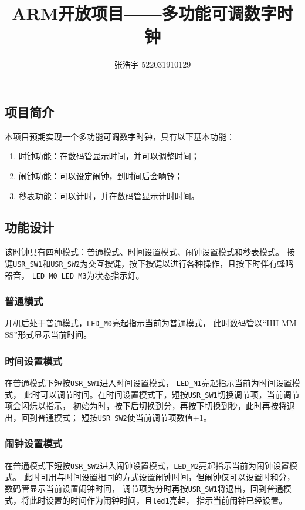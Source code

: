 \documentclass[12pt, a4paper, oneside]{ctexart}
\title{\textbf{ARM开放项目——多功能可调数字时钟}}
\author{张浩宇 522031910129}
\date{}
\begin{document}
    \maketitle
    \subsection{项目简介}
    本项目预期实现一个多功能可调数字时钟，具有以下基本功能：
    \begin{enumerate}
        \item 时钟功能：在数码管显示时间，并可以调整时间；
        \item 闹钟功能：可以设定闹钟，到时间后会响铃；
        \item 秒表功能：可以计时，并在数码管显示计时时间。
    \end{enumerate}
    \subsection{功能设计}
    该时钟具有四种模式：普通模式、时间设置模式、闹钟设置模式和秒表模式。
    按键\verb|USR_SW1|和\verb|USR_SW2|为交互按键，按下按键以进行各种操作，且按下时伴有蜂鸣器音，
    \verb|LED_M0|~\verb|LED_M3|为状态指示灯。
    \subsubsection{普通模式}
    开机后处于普通模式，\verb|LED_M0|亮起指示当前为普通模式，
    此时数码管以“HH-MM-SS”形式显示当前时间。
    \subsubsection{时间设置模式}
    在普通模式下短按\verb|USR_SW1|进入时间设置模式，
    \verb|LED_M1|亮起指示当前为时间设置模式，
    此时可以调节时间。在时间设置模式下，短按\verb|USR_SW1|切换调节项，当前调节项会闪烁以指示，
    初始为时，按下后切换到分，再按下切换到秒，此时再按将退出，回到普通模式；
    短按\verb|USR_SW2|使当前调节项数值+1。
    \subsubsection{闹钟设置模式}
    在普通模式下短按\verb|USR_SW2|进入闹钟设置模式，\verb|LED_M2|亮起指示当前为闹钟设置模式。
    此时可用与时间设置相同的方式设置闹钟时间，但闹钟仅可以设置时和分，数码管显示当前设置闹钟时间，
    调节项为分时再按\verb|USR_SW1|将退出，回到普通模式，将此时设置的时间作为闹钟时间，且\verb|led1|亮起，
    指示当前闹钟已经设置。
\end{document}
